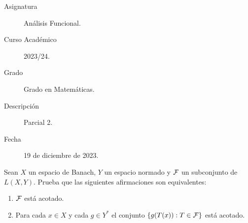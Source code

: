 \documentclass[12pt]{article}
\begin{document}

    
    

    \begin{description}
        \item[Asignatura] Análisis Funcional.
        \item[Curso Académico] 2023/24.
        \item[Grado] Grado en Matemáticas.
        \item[Descripción] Parcial 2.
        \item[Fecha] 19 de diciembre de 2023.
    
    \end{description}
    \newpage


    


    \begin{ejercicio}
        Sean $X$ un espacio de Banach, $Y$ un espacio normado y $\mathcal{F}$ un subconjunto de $L(X,Y)$. Prueba que las siguientes afirmaciones son equivalentes:
        \begin{enumerate}[label=\alph*)]
            \item $\mathcal{F}$ está acotado.
            \item Para cada $x\in X$ y cada $g\in Y^\ast$ el conjunto $\{g(T(x)) : T\in \mathcal{F}\}$ está acotado.
        \end{enumerate}
    \end{ejercicio}
\end{document}
